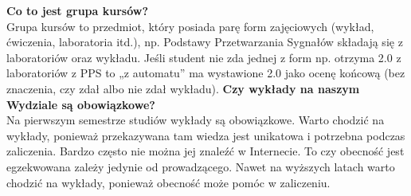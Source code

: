 \documentclass[11pt]{article}
\begin{document}
\textbf{Co to jest grupa kursów?} \\
\indent Grupa kursów to przedmiot, który posiada parę form zajęciowych (wykład, ćwiczenia, laboratoria itd.), np. Podstawy Przetwarzania Sygnałów składają się z laboratoriów oraz wykładu. Jeśli student nie zda jednej z form np. otrzyma 2.0 z laboratoriów z PPS to „z automatu” ma wystawione 2.0 jako ocenę końcową (bez znaczenia, czy zdał albo nie zdał wykładu).
\newpage
\noindent \textbf{Czy wykłady na naszym Wydziale są obowiązkowe?} \\
\indent Na pierwszym semestrze studiów wykłady są obowiązkowe. Warto chodzić na wykłady, ponieważ przekazywana tam wiedza jest unikatowa i potrzebna podczas zaliczenia. Bardzo często nie można jej znaleźć w Internecie. To czy obecność jest egzekwowana zależy jedynie od prowadzącego. Nawet na wyższych latach warto chodzić na wykłady, ponieważ obecność może pomóc w zaliczeniu.
\end{document}
